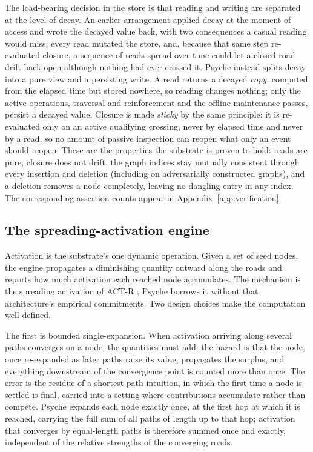 \documentclass[11pt]{article}
\begin{document}
The load-bearing decision in the store is that reading and writing are separated at
the level of decay. An earlier arrangement applied decay at the moment of access and
wrote the decayed value back, with two consequences a casual reading would miss:
every read mutated the store, and, because that same step re-evaluated closure, a
sequence of reads spread over time could let a closed road drift back open although
nothing had ever crossed it. Psyche instead splits decay into a pure view and a
persisting write. A read returns a decayed \emph{copy}, computed from the elapsed time
but stored nowhere, so reading changes nothing; only the active operations,
traversal and reinforcement and the offline maintenance passes, persist a decayed
value. Closure is made \emph{sticky} by the same principle: it is re-evaluated only on
an active qualifying crossing, never by elapsed time and never by a read, so no amount
of passive inspection can reopen what only an event should reopen. These are the
properties the substrate is proven to hold: reads are pure, closure does not drift,
the graph indices stay mutually consistent through every insertion and deletion
(including on adversarially constructed graphs), and a deletion removes a node
completely, leaving no dangling entry in any index. The corresponding assertion counts
appear in Appendix~\ref{app:verification}.

\subsection{The spreading-activation engine}

Activation is the substrate's one dynamic operation. Given a set of seed nodes, the
engine propagates a diminishing quantity outward along the roads and reports how much
activation each reached node accumulates. The mechanism is the spreading activation of
ACT-R \citep{anderson1998atomic}; Psyche borrows it without that architecture's
empirical commitments. Two design choices make the
computation well defined.

The first is bounded single-expansion. When activation arriving along several paths
converges on a node, the quantities must add; the hazard is that the node, once
re-expanded as later paths raise its value, propagates the surplus, and everything
downstream of the convergence point is counted more than once. The error is the
residue of a shortest-path intuition, in which the first time a node is settled is
final, carried into a setting where contributions accumulate rather than compete.
Psyche expands each node exactly once, at the first hop at which it is reached,
carrying the full sum of all paths of length up to that hop; activation that converges
by equal-length paths is therefore summed once and exactly, independent of the
relative strengths of the converging roads.
\end{document}
